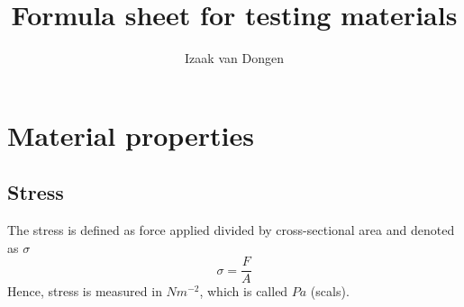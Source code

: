 \documentclass{article}
\title{Formula sheet for testing materials}
\author{Izaak van Dongen}
\begin{document}
    \maketitle
    \section{Material properties}
    \subsection{Stress}
    The stress is defined as force applied divided by cross-sectional area and denoted as $\sigma$
    \begin{equation}
        \sigma = \frac{F}{A}
    \end{equation}
    Hence, stress is measured in $Nm^{-2}$, which is called $Pa$ (scals).
\end{document}
